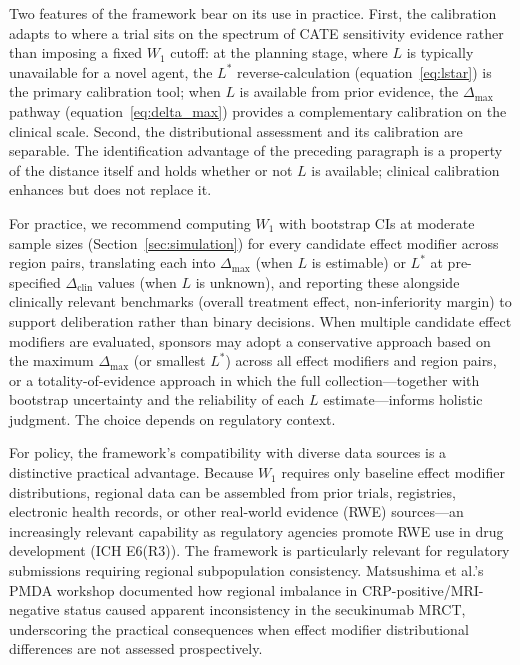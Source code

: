 \documentclass[AMA,Times1COL]{WileyNJDv5}
\begin{document}
Two features of the framework bear on its use in practice. First, the calibration adapts to where a trial sits on the spectrum of CATE sensitivity evidence rather than imposing a fixed $W_1$ cutoff: at the planning stage, where $L$ is typically unavailable for a novel agent, the $L^*$ reverse-calculation (equation~\ref{eq:lstar}) is the primary calibration tool; when $L$ is available from prior evidence, the $\Delta_{\max}$ pathway (equation~\ref{eq:delta_max}) provides a complementary calibration on the clinical scale. Second, the distributional assessment and its calibration are separable. The identification advantage of the preceding paragraph is a property of the distance itself and holds whether or not $L$ is available; clinical calibration enhances but does not replace it.

For practice, we recommend computing $W_1$ with bootstrap CIs at moderate sample sizes (Section~\ref{sec:simulation}) for every candidate effect modifier across region pairs, translating each into $\Delta_{\max}$ (when $L$ is estimable) or $L^*$ at pre-specified $\Delta_{\text{clin}}$ values (when $L$ is unknown), and reporting these alongside clinically relevant benchmarks (overall treatment effect, non-inferiority margin) to support deliberation rather than binary decisions. When multiple candidate effect modifiers are evaluated, sponsors may adopt a conservative approach based on the maximum $\Delta_{\max}$ (or smallest $L^*$) across all effect modifiers and region pairs, or a totality-of-evidence approach in which the full collection---together with bootstrap uncertainty and the reliability of each $L$ estimate---informs holistic judgment. The choice depends on regulatory context.

For policy, the framework's compatibility with diverse data sources is a distinctive practical advantage. Because $W_1$ requires only baseline effect modifier distributions, regional data can be assembled from prior trials, registries, electronic health records, or other real-world evidence (RWE) sources---an increasingly relevant capability as regulatory agencies promote RWE use in drug development (ICH E6(R3)). The framework is particularly relevant for regulatory submissions requiring regional subpopulation consistency.\cite{matsushima2024,song2025} Matsushima et al.'s\cite{matsushima2024} PMDA workshop documented how regional imbalance in CRP-positive/MRI-negative status caused apparent inconsistency in the secukinumab MRCT, underscoring the practical consequences when effect modifier distributional differences are not assessed prospectively.
\end{document}
